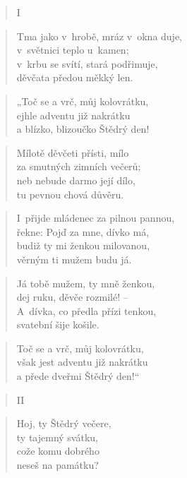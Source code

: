 
\begin{verse}
I~\end{verse}

\begin{verse}
Tma jako v~hrobě, mráz v~okna duje, \\
v~světnici teplo u~kamen; \\
v~krbu se svítí, stará podřimuje, \\
děvčata předou měkký len.
\end{verse}

\begin{verse}
„Toč se a vrč, můj kolovrátku, \\
ejhle adventu již nakrátku \\
a blízko, blizoučko Štědrý den!
\end{verse}

\begin{verse}
Mílotě děvčeti přísti, mílo \\
za smutných zimních večerů; \\
neb nebude darmo její dílo, \\
tu pevnou chová důvěru.
\end{verse}

\begin{verse}
I~přijde mládenec za pilnou pannou, \\
řekne: Pojď za mne, dívko má, \\
budiž ty mi ženkou milovanou, \\
věrným ti mužem budu já.
\end{verse}

\begin{verse}
Já tobě mužem, ty mně ženkou, \\
dej ruku, děvče rozmilé! -- \\
A~dívka, co předla přízi tenkou, \\
svatební šije košile.
\end{verse}

\begin{verse}
Toč se a vrč, můj kolovrátku, \\
však jest adventu již nakrátku \\
a přede dveřmi Štědrý den!“
\end{verse}

\begin{verse}
II
\end{verse}

\begin{verse}
Hoj, ty Štědrý večere, \\
ty tajemný svátku, \\
cože komu dobrého \\
neseš na památku?
\end{verse}

